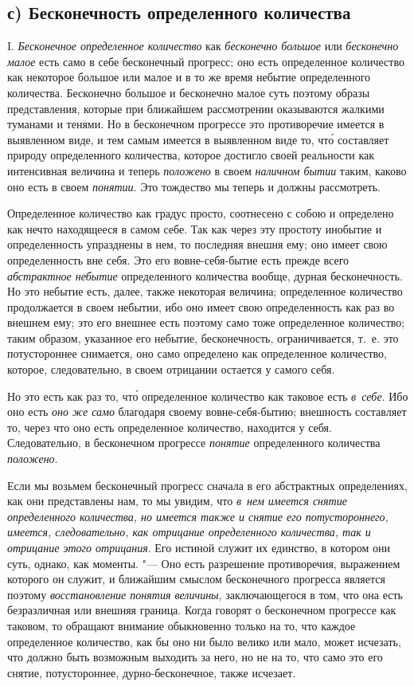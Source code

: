 \subsection[с) Бесконечность определенного количества]%
{с) Бесконечность определенного количества}

I. {\em Бесконечное определенное количество} как {\em бесконечно большое} или
{\em бесконечно малое} есть само в себе бесконечный прогресс; оно есть
определенное количество как некоторое большое или малое и в то же время
небытие определенного количества. Бесконечно большое и бесконечно малое суть
поэтому образы представления, которые при ближайшем рассмотрении оказываются
жалкими туманами и тенями. Но в бесконечном прогрессе это противоречие имеется
в выявленном виде, и тем самым имеется в выявленном виде то, чт\'{о} составляет
природу определенного количества, которое достигло своей реальности как
интенсивная величина и теперь {\em положено} в своем {\em наличном бытии}
таким, каково оно есть в своем {\em понятии}. Это тождество мы теперь и должны
рассмотреть.

Определенное количество как градус просто, соотнесено с собою и определено как
нечто находящееся в самом себе. Так как через эту простоту инобытие
и определенность упразднены в нем, то последняя внешня ему; оно имеет свою
определенность вне себя. Это его вовне-себя-бытие есть прежде всего
{\em абстрактное небытие} определенного количества вообще, дурная
бесконечность. Но это небытие есть, далее, также некоторая величина;
определенное количество продолжается в своем небытии, ибо оно имеет свою
определенность как раз во внешнем ему; это его внешнее есть поэтому само тоже
определенное количество; таким образом, указанное его небытие, бесконечность,
ограничивается, т.~е. это потустороннее снимается, оно само определено как
определенное количество, которое, следовательно, в своем отрицании остается
у самого себя.

Но это есть как раз то, чт\'{о} определенное количество как таковое есть
{\em в~себе}. Ибо оно есть {\em оно же само} благодаря своему вовне-себя-бытию;
внешность составляет то, через что оно есть определенное количество, находится
у себя. Следовательно, в бесконечном прогрессе {\em понятие} определенного
количества {\em положено}.

Если мы возьмем бесконечный прогресс сначала в его абстрактных определениях,
как они представлены нам, то мы увидим, что {\em в~нем имеется снятие
определенного количества, но имеется также и снятие его потустороннего,
имеется, следовательно, как отрицание определенного количества, так и отрицание
этого отрицания}. Его истиной служит их единство, в котором они суть, однако,
как моменты. "--- Оно есть разрешение противоречия, выражением которого он
служит, и ближайшим смыслом бесконечного прогресса является поэтому
{\em восстановление понятия величины}, заключающегося в том, что она есть
безразличная или внешняя граница. Когда говорят о бесконечном прогрессе как
таковом, то обращают внимание обыкновенно только на то, что каждое определенное
количество, как бы оно ни было велико или мало, может исчезать, что должно быть
возможным выходить за него, но не на то, что само это его снятие,
потустороннее, дурно-бесконечное, также исчезает.

